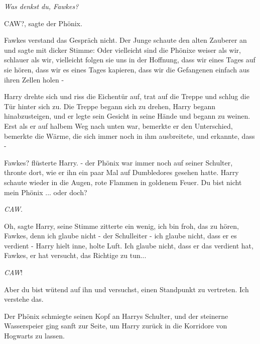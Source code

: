 \emph{Was denkst du, Fawkes?}

\glqq CAW?\grqq{}, sagte der Phönix.

Fawkes verstand das Gespräch nicht. Der Junge schaute den alten Zauberer an und
sagte mit dicker Stimme: \glqq Oder vielleicht sind die Phönixe weiser als wir,
schlauer als wir, vielleicht folgen sie uns in der Hoffnung, dass wir eines
Tages auf sie hören, dass wir es eines Tages kapieren, dass wir die Gefangenen
einfach aus ihren Zellen holen -\grqq{}

Harry drehte sich und riss die Eichentür auf, trat auf die Treppe und schlug die
Tür hinter sich zu. Die Treppe begann sich zu drehen, Harry begann
hinabzusteigen, und er legte sein Gesicht in seine Hände und begann zu weinen.
Erst als er auf halbem Weg nach unten war, bemerkte er den Unterschied, bemerkte
die Wärme, die sich immer noch in ihm ausbreitete, und erkannte, dass -

\glqq Fawkes? flüsterte Harry. - der Phönix war immer noch auf seiner Schulter,
thronte dort, wie er ihn ein paar Mal auf Dumbledores gesehen hatte. Harry
schaute wieder in die Augen, rote Flammen in goldenem Feuer. \glqq Du bist nicht
mein Phönix ... oder doch?\grqq{}

\emph{CAW}.

\glqq Oh\grqq{}, sagte Harry, seine Stimme zitterte ein wenig, \glqq ich bin
froh, das zu hören, Fawkes, denn ich glaube nicht - der Schulleiter - ich glaube
nicht, dass er es verdient -\grqq{} Harry hielt inne, holte Luft. \glqq Ich
glaube nicht, dass er das verdient hat, Fawkes, er hat versucht, das Richtige zu
tun...\grqq{}

\emph{CAW}!

\glqq Aber du bist wütend auf ihn und versuchst, einen Standpunkt zu vertreten.
Ich verstehe das.\grqq{}

Der Phönix schmiegte seinen Kopf an Harrys Schulter, und der steinerne
Wasserspeier ging sanft zur Seite, um Harry zurück in die Korridore von Hogwarts
zu lassen.

